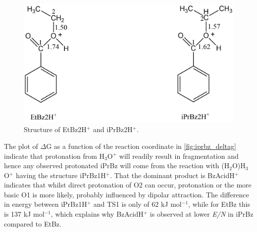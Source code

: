 %

\begin{figure}[htbp]
\centering
\includegraphics[width=0.5\linewidth]{pics/cocaine-chapter/iprbz_ts.png}
\caption{Structure of EtBz2H$^+$ and iPrBz2H$^+$.}
\label{fig:iprbz_ts}
\end{figure}



The plot of $\Delta$G as a function of the reaction coordinate in \autoref{fig:iprbz_deltag} indicate that protonation from H$_3$O$^+$ will readily result in fragmentation and hence any observed protonated iPrBz will  come from the reaction with (H$_2$O)H$_3$O$^+$ having the structure iPrBz1H$^+$.
%
That the dominant product is BzAcidH$^+$ indicates that whilst direct protonation of O2 can occur, protonation or the more basic O1 is more likely, probably influenced by dipolar attraction.
%
The difference in energy between iPrBz1H$^+$ and TS1 is only of 62 kJ mol$^{-1}$, while for EtBz this is 137 kJ mol$^{-1}$, which explains why BzAcidH$^+$ is observed at lower \textit{E/N} in iPrBz compared to EtBz.




